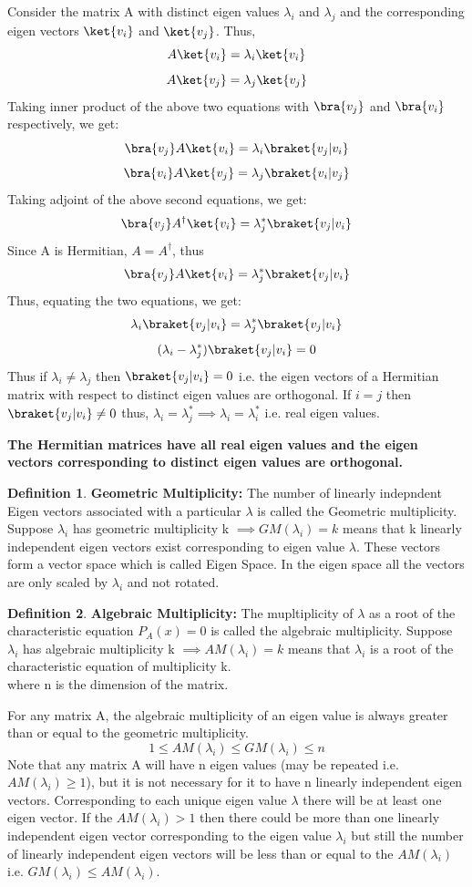 \documentclass[12pt, oneside]{book}
\theoremstyle{definition}
\newtheorem{definition}{Definition}[section]
\theoremstyle{definition}
\theoremstyle{remark}
\begin{document}
\begin{itemize}
    Consider the matrix A with distinct eigen values $\lambda_i$ and $\lambda_j$ and the corresponding eigen vectors $\ket{v_i}$ and $\ket{v_j}$. Thus,
    \[ A\ket{v_i}=\lambda_i\ket{v_i} \]
    \[ A\ket{v_j}=\lambda_j\ket{v_j} \]
    Taking inner product of the above two equations with $\bra{v_j}$ and $\bra{v_i}$ respectively, we get:
    \[ \bra{v_j}A\ket{v_i}=\lambda_i\braket{v_j|v_i} \]
    \[ \bra{v_i}A\ket{v_j}=\lambda_j\braket{v_i|v_j} \]
    Taking adjoint of the above second equations, we get:
    \[ \bra{v_j}A^{\dagger}\ket{v_i}=\lambda_j^*\braket{v_j|v_i} \]
    Since A is Hermitian, $A=A^{\dagger}$, thus
    \[ \bra{v_j}A\ket{v_i}=\lambda_j^*\braket{v_j|v_i} \]
    Thus, equating the two equations, we get:
    \[ \lambda_i\braket{v_j|v_i}=\lambda_j^*\braket{v_j|v_i} \]
    \[ (\lambda_i-\lambda_j^*)\braket{v_j|v_i}=0 \]
    Thus if $\lambda_i \neq \lambda_j$ then $\braket{v_j|v_i}=0$ i.e. the eigen vectors of a Hermitian matrix with respect to distinct eigen values are orthogonal.
    If $i=j$ then $\braket{v_j|v_i} \neq 0$ thus, $\lambda_i=\lambda_j^* \implies \lambda_i=\lambda_i^*$ i.e. real eigen values.  

    \textbf{The Hermitian matrices have all real eigen values and the eigen vectors corresponding to distinct eigen values are orthogonal.}

\end{itemize}
\begin{definition}
\textbf{Geometric Multiplicity: }
The number of linearly indepndent Eigen vectors associated with a particular $\lambda$ is called
the Geometric multiplicity. Suppose
$\lambda_i$ has geometric multiplicity k $\implies GM(\lambda_i)=k$ means that k linearly independent eigen vectors exist corresponding 
to eigen value $\lambda$. These vectors form a vector space which is called Eigen Space. In the eigen space all the vectors are only scaled by $\lambda_i$ and not rotated.
\end{definition}
\begin{definition} \textbf{Algebraic Multiplicity: }
The mupltiplicity of $\lambda$ as a root of the characteristic equation $P_A(x)=0$ is called the algebraic multiplicity. Suppose $\lambda_i$ has algebraic multiplicity k $\implies AM(\lambda_i)=k$ means that $\lambda_i$ is a root of the characteristic equation of multiplicity k.\\
where n is the dimension of the matrix.
\end{definition}
For any matrix A, the algebraic multiplicity of an eigen value is always greater than or equal to the geometric multiplicity.\\
\[1 \leq AM(\lambda_i) \leq GM(\lambda_i) \leq n\]
Note that any matrix A will have n eigen values (may be repeated i.e. $AM(\lambda_i) \geq 1$), but it is not necessary for it to have n linearly independent eigen vectors. 
Corresponding to each unique eigen value $\lambda$ there will be at least one eigen vector. If the $AM(\lambda_i)>1$ then 
there could be more than one linearly independent eigen vector corresponding to the eigen value $\lambda_i$ but still the number of linearly independent eigen vectors
will be less than or equal to the $AM(\lambda_i)$ i.e. $GM(\lambda_i)\leq AM(\lambda_i)$.\\ 
\end{document}
